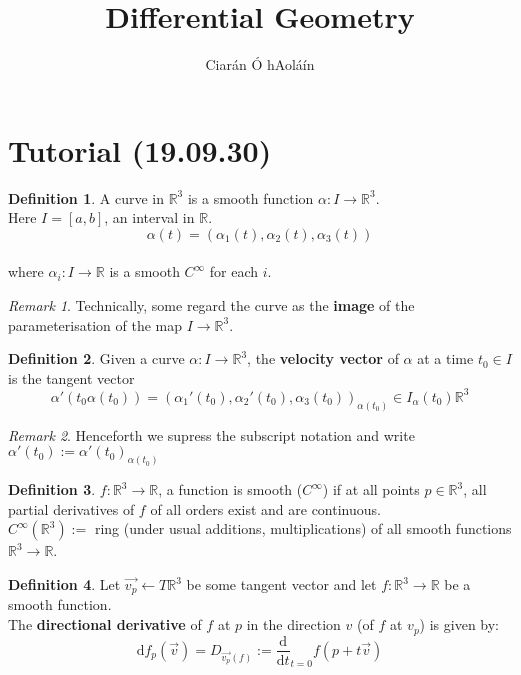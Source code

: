 \documentclass{article}
\title{Differential Geometry}
\author{Ciarán Ó hAoláín}
\renewcommand{\d}{\mathrm{d}}
\newcommand{\R}{\mathbb{R}}
\theoremstyle{definition}
\newtheorem{definition}{Definition}[section]
\theoremstyle{remark}
\theoremstyle{example}
\newtheorem*{remark}{Remark}
\begin{document}
	\maketitle
	
	\section{Tutorial (19.09.30)}
	\begin{definition}
		A curve in $\R^3$ is a smooth function $\alpha:I \to \R^3$.\\
		Here $I=[a,b]$, an interval in $\R$.\\
		\[ \alpha(t) = (\alpha_1(t), \alpha_2(t), \alpha_3(t))  \]\\
		where $\alpha_i : I \to \R$ is a smooth $C^\infty$ for each $i$.
		\begin{remark}
			Technically, some regard the curve as the \textbf{image} of the parameterisation of the map $I \to \R^3$.
		\end{remark}
	\end{definition}

	\begin{definition}
		Given a curve $\alpha:I \to \R^3$, the \textbf{velocity vector} of $\alpha$ at a time $t_0 \in I$ is the tangent vector \[\alpha'(t_0\alpha(t_0)) = (\alpha_1'(t_0), \alpha_2'(t_0), \alpha_3(t_0))_{\alpha(t_0)} \in I_\alpha(t_0)\R^3 \]
	\end{definition}
	\begin{remark}
		Henceforth we supress the subscript notation and write $\alpha'(t_0):= \alpha'(t_0)_{\alpha(t_0)}$
	\end{remark}

	\begin{definition}
		$f: \R^3 \to \R$, a function is smooth ($C^\infty$) if at all points $p \in \R^3$, all partial derivatives of $f$ of all orders exist and are continuous.\\
		$C^\infty(\R^3):=$ ring (under usual additions, multiplications) of all smooth functions $\R^3 \to \R$.
	\end{definition}

	\begin{definition}
		Let $\vec{v_p} \leftarrow T \R^3 $ be some tangent vector and let $f:\R^3 \to \R$ be a smooth function.\\
		The \textbf{directional derivative} of $f$ at $p$ in the direction $v$ (of $f$ at $v_p$) is given by: \[\d f_p(\vec{v}) = D_{\vec{v_p}(f)} := \frac{\d}{\d t}_{t=0}f(p+t \vec{v})\]
	\end{definition}
\end{document}
